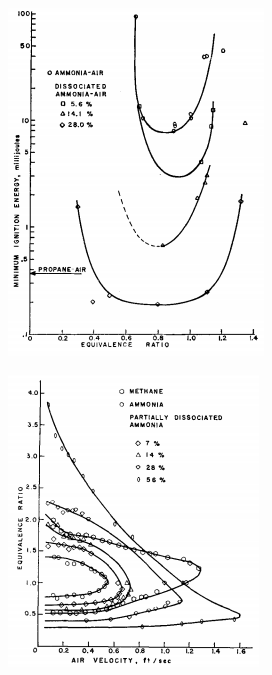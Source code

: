 \documentclass[11pt, oneside]{article}
\begin{document}
  \begin{figure} [h]
\centering
\begin{subfigure}{.5\textwidth}
  \centering
  \includegraphics[width=0.9\linewidth]{./pictures/ignitionenergyNH3.png}
  \label{fig:mixproperties1}
\end{subfigure}%
\begin{subfigure}{.5\textwidth}
  \centering
  \includegraphics[width=0.9\linewidth]{./pictures/flamestabilityNH3.png}

\end{subfigure}
\end{figure}
\end{document}
